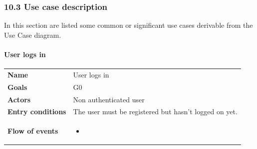 \documentclass[]{article}
\providecommand{\tightlist}{%
  \setlength{\itemsep}{0pt}\setlength{\parskip}{0pt}}
\let\oldparagraph\paragraph
\renewcommand{\paragraph}[1]{\oldparagraph{#1}\mbox{}}
\begin{document}
\subsubsection{10.3 Use case description}\label{use-case-description}

In this section are listed some common or significant use cases
derivable from the Use Case diagram.

\paragraph{User logs in}\label{user-logs-in}

\begin{longtable}[]{@{}ll@{}}
\toprule
\begin{minipage}[t]{0.29\columnwidth}\raggedright\strut
\textbf{Name}\strut
\end{minipage} & \begin{minipage}[t]{0.65\columnwidth}\raggedright\strut
User logs in\strut
\end{minipage}\tabularnewline
\begin{minipage}[t]{0.29\columnwidth}\raggedright\strut
\textbf{Goals}\strut
\end{minipage} & \begin{minipage}[t]{0.65\columnwidth}\raggedright\strut
G0\strut
\end{minipage}\tabularnewline
\begin{minipage}[t]{0.29\columnwidth}\raggedright\strut
\textbf{Actors}\strut
\end{minipage} & \begin{minipage}[t]{0.65\columnwidth}\raggedright\strut
Non authenticated user\strut
\end{minipage}\tabularnewline
\begin{minipage}[t]{0.29\columnwidth}\raggedright\strut
\textbf{Entry conditions}\strut
\end{minipage} & \begin{minipage}[t]{0.65\columnwidth}\raggedright\strut
The user must be registered but hasn't logged on yet.\strut
\end{minipage}\tabularnewline
\begin{minipage}[t]{0.29\columnwidth}\raggedright\strut
\textbf{Flow of events}\strut
\end{minipage} & \begin{minipage}[t]{0.65\columnwidth}\raggedright\strut
\begin{itemize}
\tightlist
\item

\end{itemize}
\end{minipage}
\end{longtable}
\end{document}
